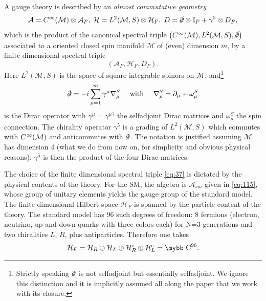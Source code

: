 \documentclass[11pt]{article}
\newcommand{\cinf}{{C^\infty({\cal M})}}
\newcommand{\M}{\mathcal M}
\newcommand{\A}{\mathcal A}
\newcommand{\HH}{\mathcal H}
\newcommand{\ds}{\slashed \partial}
\def\bb#1{\hbox{\mybb#1}}
\newcommand{\del}{\partial}
\begin{document}
A gauge theory is
described by an \emph{almost commutative geometry}
\begin{equation}
  \label{eq:02}
  \A =\cinf\otimes \A_F,\; \HH = L^{2}(\M,S)\otimes \HH_F,\;  D=
  \slashed{\partial}\otimes {\mathbb I}_F + \gamma^5\otimes D_F,
\end{equation} which is the product of the canonical spectral triple $\left(C^{\infty}(\M),L^{2}(\M,S),\slashed{\partial}\right)$ associated to
a oriented closed spin manifold $\M$ of (even)
dimension $m$, by a finite
dimensional spectral triple
\begin{equation}
(\A_F, \HH_F, D_F).\label{eq:37}
\end{equation}
Here $L^{2}(\M,S)$ is the space of square integrable spinors on $\M$,
and{\footnote{Strictly speaking $\ds$ is not selfadjoint but
    essentially selfadjoint. We ignore this distinction and it is
    implicitly assumed all along the paper that we work with its closure.}}
\begin{equation}
\slashed{\partial} = -i\sum_{\mu=1}^m \gamma^\mu\nabla_\mu^S\quad \text{
  with } \quad\nabla_\mu^S =\del_\mu + \omega_\mu^S 
\label{eq:35}
\end{equation}
 is the
Dirac operator with $\gamma^\mu={\gamma^\mu}^\dagger$ the selfadjoint
Dirac matrices and $\omega_\mu^S$ the spin connection. The chirality operator $\gamma^5$ 
is a grading of $L^2(\M,S)$ which commutes with $\cinf$
and anticommutes with $\slashed\partial$.
The notation is justified assuming $\M$ has dimension $4$ (what we do
from now on, for simplicity and obvious physical reasons): $\gamma^5$
is then the product of the four Dirac matrices. 

The choice of the finite dimensional spectral triple \eqref{eq:37} is dictated by
the physical contents of the theory. For the SM, the algebra is
$\A_{sm}$ given in \eqref{eq:115}, whose group of unitary elements yields the gauge group
of the standard model. The finite dimensional Hilbert space $\HH_F$ is spanned by the particle
content of the theory. The standard model has 96 such degrees of freedom:
8 fermions (electron, neutrino, up and down quarks with three
colors each) for N=3 generations and  two chiralities $L$, $R$, plus
antiparticles. Therefore one takes
\begin{equation}
\mathcal{H}_{F}=
\mathcal{H}_{R}\oplus\mathcal{H}_{L}\oplus\mathcal{H}_{R}^{c}\oplus\mathbb{\mathcal{H}}_{L}^{c}=\bb C^{96}.
\label{eq:56}
\end{equation}
\end{document}
